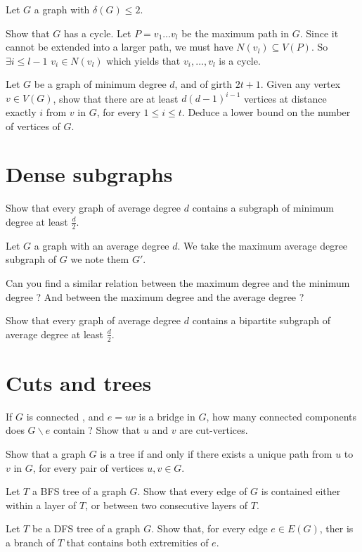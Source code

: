 \documentclass{article}
\theoremstyle{plain}
\begin{document}
  \begin{correction}{}{}
    Let $G$ a graph with $\delta(G) \leq 2$.

    Show that $G$ has a cycle. Let $P = v_1 \ldots v_l$ be the maximum path in
    $G$. Since it cannot be extended into a larger path, we must have $N(v_l)
    \subseteq V(P)$. So $\exists i \leq l-1$ $v_i \in N(v_l)$ which yields that
    $v_i, \ldots , v_l$ is a cycle.
  \end{correction}

  \exercice Let $G$ be a graph of minimum degree $d$, and of girth $2t+1$. Given
  any vertex $v \in V(G)$, show that there are at least $d(d-1)^{i-1}$ vertices
  at distance exactly $i$ from $v$ in $G$, for every $1 \leq i \leq t$. Deduce a
  lower bound on the number of vertices of $G$.

  \begin{correction}{}{}
  \end{correction}


  \section{Dense subgraphs}

  \exercice Show that every graph of average degree $d$ contains a subgraph of
  minimum degree at least $\frac d 2$.

  \begin{correction}{}{}
    Let $G$ a graph with an average degree $d$. We take the maximum average
    degree subgraph of $G$ we note them $G'$.
  \end{correction}

  \exercice Can you find a similar relation between the maximum degree and the
  minimum degree ? And between the maximum degree and the average degree ?

  \exercice Show that every graph of average degree $d$ contains a bipartite
  subgraph of average degree at least $\frac d 2$.

  \section{Cuts and trees}

  \exercice If $G$ is connected , and $e=uv$ is a bridge in $G$, how many
  connected components does $G\backslash e$ contain ? Show that $u$ and $v$ are
  cut-vertices.

  \exercice Show that a graph $G$ is a tree if and only if there exists a unique
  path from $u$ to $v$ in $G$, for every pair of vertices $u, v \in G$.

  \exercice Let $T$ a BFS tree of a graph $G$. Show that every edge of $G$ is
  contained either within a layer of $T$, or between two consecutive layers of
  $T$.

  \exercice Let $T$ be a DFS tree of a graph $G$. Show that, for every edge $e
  \in E(G)$, ther is a branch of $T$ that contains both extremities of $e$.
\end{document}

